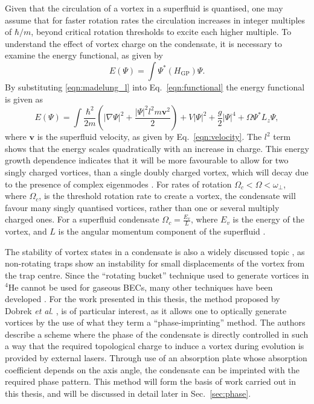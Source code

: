 Given that the circulation of a vortex in a superfluid is quantised, one may assume that for faster rotation rates the circulation increases in integer multiples of $\hbar/m$, beyond critical rotation thresholds to excite each higher multiple. To understand the effect of vortex charge on the condensate, it is necessary to examine the energy functional, as given by
    \begin{equation}\label{eqn:functional}
        E(\Psi) = \int \Psi^{*} (H_{\text{GP}}) \Psi.
    \end{equation}
By substituting \ref{eqn:madelung_l} into Eq.~\eqref{eqn:functional} the energy functional is given as
\begin{equation}\label{eqn:functional_full}
    E(\Psi) = \int \frac{\hbar^2}{2m} \left(|\nabla\Psi|^2  + \frac{|\Psi|^2 l^2 m \mathbf{v}^2}{2}  \right) + V|\Psi|^2 + \frac{g}{2}|\Psi|^4 + \Omega \Psi^{*} L_z \Psi,
\end{equation}
where $\mathbf{v}$ is the superfluid velocity, as given by Eq.~\eqref{eqn:velocity}. The $l^2$ term shows that the energy scales quadratically with an increase in charge. This energy growth dependence indicates that it will be more favourable to allow for two singly charged vortices, than a single doubly charged vortex, which will decay due to the presence of complex eigenmodes \cite{VTX:Kawaguchi_pra_2004}. For rates of rotation $\Omega_c < \Omega < \omega_\perp$, where $\Omega_c$, is the threshold rotation rate to create a vortex, the condensate will favour many singly quantised vortices, rather than one or several multiply charged ones. For a superfluid condensate $\Omega_c = \frac{E_v}{L}$, where $E_v$ is the energy of the vortex, and $L$ is the angular momentum component of the superfluid \cite{BK:Pitaevskii_Stringari_2003}.

The stability of vortex states in a condensate is also a widely discussed topic \cite{Vtx:Fedichev_pra_1999,Vtx:Feder_prl_1999}, as non-rotating traps show an instability for small displacements of the vortex from the trap centre. Since the ``rotating bucket'' technique used to generate vortices in $^4$He cannot be used for gaseous BECs, many other techniques have been developed \cite{Vtx:Anglin_prl_1999,Vtx:Davies_prl_1999,Vtx:Marshall_pra_1999,Vtx:Dobrek_pra_1999,VTX:Nakahara_physb_2000}. For the work presented in this thesis, the method proposed by Dobrek \textit{et al}. \cite{Vtx:Dobrek_pra_1999}, is of particular interest, as it allows one to optically generate vortices by the use of what they term a ``phase-imprinting'' method. The authors describe a scheme where the phase of the condensate is directly controlled in such a way that the required topological charge to induce a vortex during evolution is provided by external lasers. Through use of an absorption plate whose absorption coefficient depends on the axis angle, the condensate can be imprinted with the required phase pattern. This method will form the basis of work carried out in this thesis, and will be discussed in detail later in Sec.~\ref{sec:phase}.


